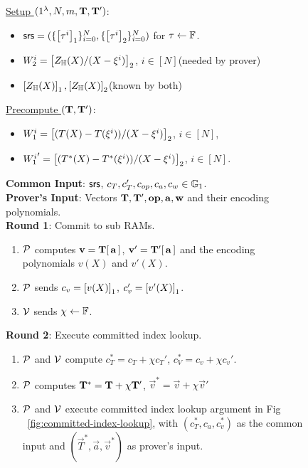\begin{figure}[t!]
    \begin{mdframed}

        \underline{Setup $(1^{\lambda},N,m, \mathbf{T}, \mathbf{T}')$}:
        \begin{itemize}[leftmargin=1em]
            \item $\mathsf{srs} = (\{\left[{\tau^i}\right]_1\}_{i=0}^N, \{\left[{\tau^i}\right]_2\}_{i=0}^N)$ for $\tau\gets \mathbb{F}$.
            \item $W_2^i=\left[{Z_\mathbb{H}(X)/(X-\xi^i)}\right]_2$, $i\in [N]$(needed by prover)
            \item $\left[{Z_\mathbb{H}(X)}\right]_1, \left[{Z_\mathbb{H}(X)}\right]_2$(known by both)
        \end{itemize}

        \underline{Precompute $(\mathbf{T}, \mathbf{T}')$}:
        \begin{itemize}[leftmargin=1em]
            \item $W_1^i=\left[{(T(X)-T(\xi^i))/(X-\xi^i)}\right]_2$, $i\in [N]$,
            \item ${W_1^i}'=\left[{(T^*(X) - T^*(\xi^i))/(X-\xi^i)}\right]_2$, $i\in [N]$.
        \end{itemize}

        {\bf Common Input}: $\mathsf{srs}$, $c_T, c_T', c_{op}, c_a, c_w\in \mathbb{G}_1$.\\
        {\bf Prover's Input}: Vectors $\mathbf{T},\mathbf{T}',\mathbf{{op}},\mathbf{a},\mathbf{w}$ and their encoding polynomials.\\

        {\bf Round 1}: Commit to sub RAMs.
        \begin{enumerate}[leftmargin=1em, label=\arabic*.]
            \item $\mathcal{P}$ computes $\mathbf{v}=\mathbf{T}[\,\mathbf{a}\,]$, $\mathbf{v}'=\mathbf{T}'[\,\mathbf{a}\,]$ and the encoding
            polynomials $v(X)$ and $v'(X)$.
            \item $\mathcal{P}$ sends $c_v = \left[{v(X)}\right]_1$, $c_v'=\left[{v'(X)}\right]_1$.
            \item $\mathcal{V}$ sends $\chi\gets \mathbb{F}$.
        \end{enumerate}

        {\bf Round 2}: Execute committed index lookup.
        \begin{enumerate}[leftmargin=1em, label=\arabic*.]
            \item $\mathcal{P}$ and $\mathcal{V}$ compute $c_T^\ast=c_T + \chi c_T'$, $c_V^\ast=c_v + \chi c_v'$.
            \item $\mathcal{P}$ computes $\mathbf{T}^\ast = \mathbf{T} + \chi \mathbf{T}'$, $\vec{v}^\ast = \vec{v} + \chi \vec{v}'$
            \item $\mathcal{P}$ and $\mathcal{V}$ execute committed index lookup argument in Fig ~\ref{fig:committed-index-lookup},
            with $(c_T^\ast,c_a,c_v^\ast)$ as the common input and $(\vec{T}^\ast, \vec{a},\vec{v}^\ast)$ as prover's input.
        \end{enumerate}


\end{mdframed}
\end{figure}

